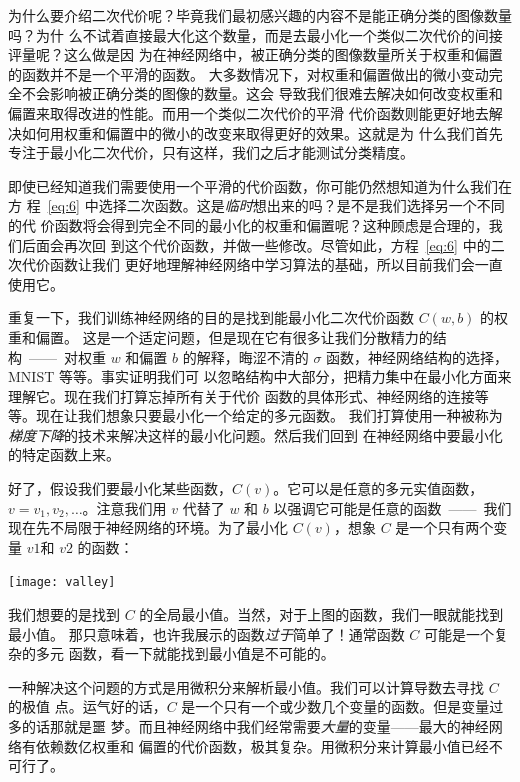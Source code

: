 为什么要介绍二次代价呢？毕竟我们最初感兴趣的内容不是能正确分类的图像数量吗？为什
么不试着直接最大化这个数量，而是去最小化一个类似二次代价的间接评量呢？这么做是因
为在神经网络中，被正确分类的图像数量所关于权重和偏置的函数并不是一个平滑的函数。
大多数情况下，对权重和偏置做出的微小变动完全不会影响被正确分类的图像的数量。这会
导致我们很难去解决如何改变权重和偏置来取得改进的性能。而用一个类似二次代价的平滑
代价函数则能更好地去解决如何用权重和偏置中的微小的改变来取得更好的效果。这就是为
什么我们首先专注于最小化二次代价，只有这样，我们之后才能测试分类精度。

即使已经知道我们需要使用一个平滑的代价函数，你可能仍然想知道为什么我们在方
程~\eqref{eq:6} 中选择二次函数。这是\emph{临时}想出来的吗？是不是我们选择另一个不同的代
价函数将会得到完全不同的最小化的权重和偏置呢？这种顾虑是合理的，我们后面会再次回
到这个代价函数，并做一些修改。尽管如此，方程~\eqref{eq:6} 中的二次代价函数让我们
更好地理解神经网络中学习算法的基础，所以目前我们会一直使用它。

重复一下，我们训练神经网络的目的是找到能最小化二次代价函数 $C(w,b)$ 的权重和偏置。
这是一个适定问题，但是现在它有很多让我们分散精力的结构~——~对权重 $w$ 和偏置 $b$
的解释，晦涩不清的 $\sigma$ 函数，神经网络结构的选择，MNIST 等等。事实证明我们可
以忽略结构中大部分，把精力集中在最小化方面来理解它。现在我们打算忘掉所有关于代价
函数的具体形式、神经网络的连接等等。现在让我们想象只要最小化一个给定的多元函数。
我们打算使用一种被称为\emph{梯度下降}的技术来解决这样的最小化问题。然后我们回到
在神经网络中要最小化的特定函数上来。

好了，假设我们要最小化某些函数，$C(v)$。它可以是任意的多元实值函数，$v = v_1,
v_2, \ldots$。注意我们用 $v$ 代替了 $w$ 和 $b$ 以强调它可能是任意的函数~——~我们
现在先不局限于神经网络的环境。为了最小化 $C(v)$，想象 $C$ 是一个只有两个变量
$v1$和 $v2$ 的函数：
\begin{center}
  \texttt{[image: valley]}
\end{center}

我们想要的是找到 $C$ 的全局最小值。当然，对于上图的函数，我们一眼就能找到最小值。
那只意味着，也许我展示的函数\emph{过于}简单了！通常函数 $C$ 可能是一个复杂的多元
函数，看一下就能找到最小值是不可能的。

一种解决这个问题的方式是用微积分来解析最小值。我们可以计算导数去寻找 $C$ 的极值
点。运气好的话，$C$ 是一个只有一个或少数几个变量的函数。但是变量过多的话那就是噩
梦。而且神经网络中我们经常需要\emph{大量}的变量——最大的神经网络有依赖数亿权重和
偏置的代价函数，极其复杂。用微积分来计算最小值已经不可行了。

